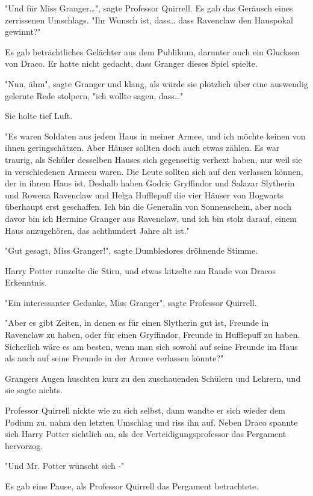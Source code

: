 {"Und für Miss Granger…", sagte Professor Quirrell. Es gab das Geräusch eines zerrissenen Umschlags. "Ihr Wunsch ist, dass… dass Ravenclaw den Hauspokal gewinnt?"

Es gab beträchtliches Gelächter aus dem Publikum, darunter auch ein Glucksen von Draco. Er hatte nicht gedacht, dass Granger dieses Spiel spielte.

"Nun, ähm", sagte Granger und klang, als würde sie plötzlich über eine auswendig gelernte Rede stolpern, "ich wollte sagen, dass…"

Sie holte tief Luft.

"Es waren Soldaten aus jedem Haus in meiner Armee, und ich möchte keinen von ihnen geringschätzen. Aber Häuser sollten doch auch etwas zählen. Es war traurig, als Schüler desselben Hauses sich gegenseitig verhext haben, nur weil sie in verschiedenen Armeen waren. Die Leute sollten sich auf den verlassen können, der in ihrem Haus ist. Deshalb haben Godric Gryffindor und Salazar Slytherin und Rowena Ravenclaw und Helga Hufflepuff die vier Häuser von Hogwarts überhaupt erst geschaffen. Ich bin die Generalin von Sonnenschein, aber noch davor bin ich Hermine Granger aus Ravenclaw, und ich bin stolz darauf, einem Haus anzugehören, das achthundert Jahre alt ist."

"Gut gesagt, Miss Granger!", sagte Dumbledores dröhnende Stimme.

Harry Potter runzelte die Stirn, und etwas kitzelte am Rande von Dracos Erkenntnis.

"Ein interessanter Gedanke, Miss Granger", sagte Professor Quirrell.

"Aber es gibt Zeiten, in denen es für einen Slytherin gut ist, Freunde in Ravenclaw zu haben, oder für einen Gryffindor, Freunde in Hufflepuff zu haben. Sicherlich wäre es am besten, wenn man sich sowohl auf seine Freunde im Haus als auch auf seine Freunde in der Armee verlassen könnte?"

Grangers Augen huschten kurz zu den zuschauenden Schülern und Lehrern, und sie sagte nichts.

Professor Quirrell nickte wie zu sich selbst, dann wandte er sich wieder dem Podium zu, nahm den letzten Umschlag und riss ihn auf. Neben Draco spannte sich Harry Potter sichtlich an, als der Verteidigungsprofessor das Pergament hervorzog.

"Und Mr. Potter wünscht sich -"

Es gab eine Pause, als Professor Quirrell das Pergament betrachtete.

}
